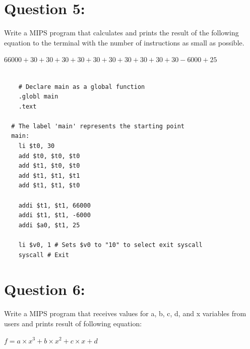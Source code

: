 \documentclass[12pt,a4paper]{article}
\begin{document}
\section*{Question 5:}

Write a MIPS program that calculates and prints the result of the following equation to the terminal with the number of instructions as small as possible.

\(66000+30+30+30+30+30+30+30+30+30+30 - 6000+25\)


\begin{mdframed}[hidealllines=true,backgroundcolor=magenta!10]
  \begin{lstlisting}

    # Declare main as a global function
    .globl main
    .text

  # The label 'main' represents the starting point
  main:
    li $t0, 30
    add $t0, $t0, $t0
    add $t1, $t0, $t0
    add $t1, $t1, $t1
    add $t1, $t1, $t0

    addi $t1, $t1, 66000
    addi $t1, $t1, -6000
    addi $a0, $t1, 25

    li $v0, 1 # Sets $v0 to "10" to select exit syscall
    syscall # Exit

          \end{lstlisting}
\end{mdframed}

\section*{Question 6:}

Write a MIPS program that receives values for a, b, c, d, and x variables from users and prints
result of following equation:

\(f = a \times x^3 + b \times x^2 + c \times x + d\)
\end{document}
